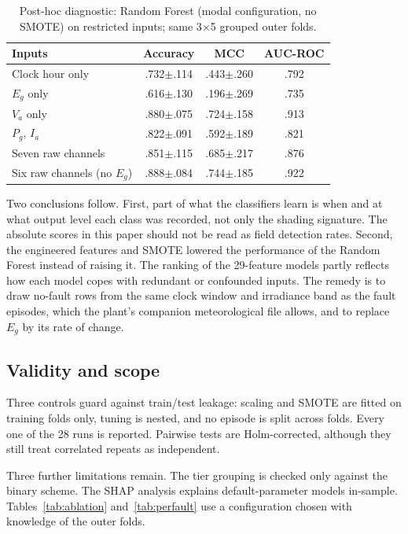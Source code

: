 \documentclass[11pt,a4paper]{article}
\begin{document}
\begin{table}[t]
\centering
\caption{Post-hoc diagnostic: Random Forest (modal configuration, no SMOTE) on restricted inputs; same 3$\times$5 grouped outer folds.}
\label{tab:confound}
\small
\begin{tabular}{@{}lccc@{}}
\toprule
Inputs & Accuracy & MCC & AUC-ROC \\
\midrule
Clock hour only & .732$\pm$.114 & .443$\pm$.260 & .792 \\
$E_g$ only & .616$\pm$.130 & .196$\pm$.269 & .735 \\
$V_a$ only & .880$\pm$.075 & .724$\pm$.158 & .913 \\
$P_g$, $I_a$ & .822$\pm$.091 & .592$\pm$.189 & .821 \\
Seven raw channels & .851$\pm$.115 & .685$\pm$.217 & .876 \\
Six raw channels (no $E_g$) & .888$\pm$.084 & .744$\pm$.185 & .922 \\
\bottomrule
\end{tabular}
\end{table}

Two conclusions follow. First, part of what the classifiers learn is when and at what output level each class was recorded, not only the shading signature. The absolute scores in this paper should not be read as field detection rates. Second, the engineered features and SMOTE lowered the performance of the Random Forest instead of raising it. The ranking of the 29-feature models partly reflects how each model copes with redundant or confounded inputs. The remedy is to draw no-fault rows from the same clock window and irradiance band as the fault episodes, which the plant's companion meteorological file allows, and to replace $E_g$ by its rate of change.

\subsection{Validity and scope}

Three controls guard against train/test leakage: scaling and SMOTE are fitted on training folds only, tuning is nested, and no episode is split across folds. Every one of the 28 runs is reported. Pairwise tests are Holm-corrected, although they still treat correlated repeats as independent.

Three further limitations remain. The tier grouping is checked only against the binary scheme. The SHAP analysis explains default-parameter models in-sample. Tables~\ref{tab:ablation} and~\ref{tab:perfault} use a configuration chosen with knowledge of the outer folds.
\end{document}
